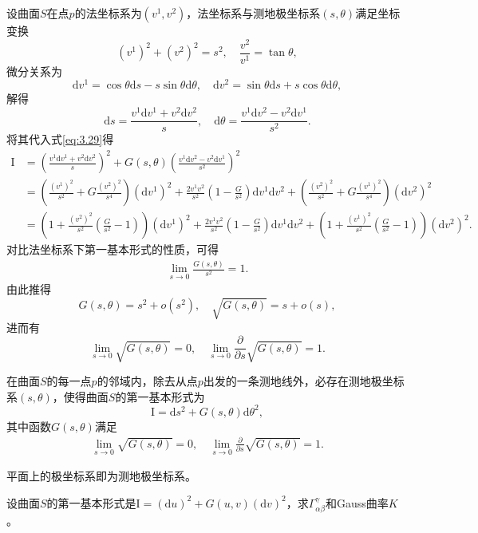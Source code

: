 \documentclass[../../main.tex]{subfiles}%
\begin{document}
设曲面$S$在点$p$的法坐标系为$(v^1,v^2)$，法坐标系与测地极坐标系$(s,\theta)$满足坐标变换
$$(v^1)^2+(v^2)^2=s^2,\quad \frac{v^2}{v^1}=\tan\theta,$$
微分关系为
$$\mathrm{d}v^1=\cos\theta\mathrm{d}s-s\sin\theta\mathrm{d}\theta,\quad \mathrm{d}v^2=\sin\theta\mathrm{d}s+s\cos\theta\mathrm{d}\theta,$$
解得
$$\mathrm{d}s=\frac{v^1\mathrm{d}v^1+v^2\mathrm{d}v^2}{s},\quad \mathrm{d}\theta=\frac{v^1\mathrm{d}v^2-v^2\mathrm{d}v^1}{s^2}.$$
将其代入式\eqref{eq:3.29}得
\begin{align*}
\mathrm{I}&=\left(\frac{v^1\mathrm{d}v^1+v^2\mathrm{d}v^2}{s}\right)^2+G(s,\theta)\left(\frac{v^1\mathrm{d}v^2-v^2\mathrm{d}v^1}{s^2}\right)^2\\
&=\left(\frac{(v^1)^2}{s^2}+G\frac{(v^2)^2}{s^4}\right)(\mathrm{d}v^1)^2+\frac{2v^1v^2}{s^2}\left(1-\frac{G}{s^2}\right)\mathrm{d}v^1\mathrm{d}v^2+\left(\frac{(v^2)^2}{s^2}+G\frac{(v^1)^2}{s^4}\right)(\mathrm{d}v^2)^2\\
&=\left(1+\frac{(v^2)^2}{s^2}\left(\frac{G}{s^2}-1\right)\right)(\mathrm{d}v^1)^2+\frac{2v^1v^2}{s^2}\left(1-\frac{G}{s^2}\right)\mathrm{d}v^1\mathrm{d}v^2+\left(1+\frac{(v^1)^2}{s^2}\left(\frac{G}{s^2}-1\right)\right)(\mathrm{d}v^2)^2.
\end{align*}
对比法坐标系下第一基本形式的性质，可得
\begin{align}
\lim_{s\to0}\frac{G(s,\theta)}{s^2}=1.
\label{eq:3.31}
\end{align}
由此推得
$$G(s,\theta)=s^2+o(s^2),\quad \sqrt{G(s,\theta)}=s+o(s),$$
进而有
$$\lim_{s\to0}\sqrt{G(s,\theta)}=0,\quad \lim_{s\to0}\frac{\partial}{\partial s}\sqrt{G(s,\theta)}=1.$$

\begin{theorem}
在曲面$S$的每一点$p$的邻域内，除去从点$p$出发的一条测地线外，必存在测地极坐标系$(s,\theta)$，使得曲面$S$的第一基本形式为
$$\mathrm{I}=\mathrm{d}s^2+G(s,\theta)\mathrm{d}\theta^2,$$
其中函数$G(s,\theta)$满足
\begin{align}
\lim_{s\to0}\sqrt{G(s,\theta)}=0,\quad \lim_{s\to0}\frac{\partial}{\partial s}\sqrt{G(s,\theta)}=1.
\label{eq:3.32}
\end{align}
\end{theorem}
\begin{remark}
平面上的极坐标系即为测地极坐标系。
\end{remark}

\begin{example}
设曲面$S$的第一基本形式是$\mathrm{I}=(\mathrm{d}u)^2+G(u,v)(\mathrm{d}v)^2$，求$\Gamma_{\alpha\beta}^{\gamma}$和Gauss曲率$K$。
\end{example}
\end{document}
